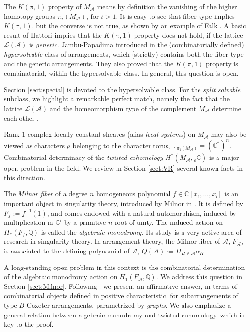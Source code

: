 \documentclass[psamsfonts]{conm-p-l}
\theoremstyle{definition}
\theoremstyle{remark}
\numberwithin{equation}{section}
\newcommand{\A}{{\mathcal A}}
\newcommand{\Q}{\mathbb{Q}}
\newcommand{\C}{\mathbb{C}}
\newcommand{\TT}{\mathbb{T}}
\begin{document}
The $K(\pi,1)$ property of $M_{\A}$ means by definition the vanishing of the higher homotopy
groups $\pi_i(M_{\A})$, for $i>1$. It is easy to see that fiber-type implies  $K(\pi,1)$, but the
converse is not true, as shown by an example of Falk \cite{Fa1}. A basic result of Hattori
\cite{Ha} implies that the $K(\pi,1)$ property does not hold, if the lattice $\mathcal L(\A)$ is
{\em generic}. Jambu-Papadima introduced in \cite{JP1} the (combinatorially defined)
{\em hypersolvable} class of arrangements, which (strictly) contains both the fiber-type 
and the generic arrangements. They also proved that the $K(\pi,1)$ property is combinatorial,
within the hypersolvable class. In general, this question is open.

Section \ref{sect:special} is devoted to the hypersolvable class. For the {\em split solvable} subclass,
we highlight a remarkable perfect match, namely the fact that the lattice $\mathcal L(\A)$ and 
the homeomorphism type of the complement $M_{\A}$ determine each other \cite{CDP}.

Rank $1$ complex locally constant sheaves (alias {\em local systems}) on  $M_{\A}$ may also be
viewed as characters $\rho$ belonging to the character torus, $\TT_{\pi_1(M_{\A})}=(\C^*)^n$.
Combinatorial determinacy of the {\em twisted cohomology} $H^*(M_{\A}, {}_{\rho}\C)$ is
a major open problem in the field. We review in Section \ref{sect:VR} 
several known facts in this direction. 

The {\em Milnor fiber} of a degree $n$ homogeneous polynomial $f\in \C [x_1, \dots, x_l]$ is
an important object in singularity theory, introduced by Milnor in \cite{Mi}. It is defined by
$F_f := f^{-1}(1)$, and comes endowed with a natural automorphism, induced by multiplication in
$\C^l$ by a primitive $n$-root of unity. The induced action on $H_*(F_f, \Q)$ is called the
{\em algebraic monodromy}. Its study is a very active area of research in singularity theory.
In arrangement theory, the Milnor fiber of $\A$, $F_{\A}$, is associated to the defining polynomial of
$\A$, $Q(\A):= \Pi_{H\in \A} \alpha_H$.

A long-standing open problem in this context is the combinatorial determination of the algebraic 
monodromy action on $H_1(F_{\A}, \Q)$. We address this question in Section \ref{sect:Milnor}.
Following \cite{MP}, we present an affirmative answer, in terms of combinatorial objects 
defined in positive characteristic, for subarrangements of type $B$ Coxeter arrangements,
parametrized by {\em graphs}. We also emphasize a general relation between algebraic monodromy
and twisted cohomology, which is key to the proof.
\end{document}
